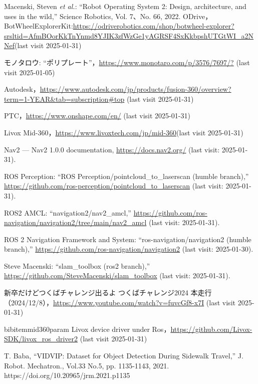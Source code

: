 \documentclass[twocolumn,9pt]{jsproceedings}
\begin{document}
\footnotesize
\begin{thebibliography}{99}
  Macenski, Steven {\it et al.}: ``Robot Operating System 2: Design, architecture, and uses in the wild,''
  Science Robotics, Vol. 7、No. 66, 2022.
  ODrive，BotWheelExplorerKit:\url{https://odriverobotics.com/shop/botwheel-explorer?srsltid=AfmBOorKkTnYnmd8YJIK3zfWzGe1yAGRSF4SxKkbpshUTGtWI_a2NNef}(last visit 2025-01-31)

  モノタロウ: ``ポリプレート''，\url{https://www.monotaro.com/p/3576/7697/?} (last visit 2025-01-05)

  
  Autodesk，\url{https://www.autodesk.com/jp/products/fusion-360/overview?term=1-YEAR&tab=subscription#top} (last visit 2025-01-31)
  
  PTC，\url{https://www.onshape.com/en/} (last visit 2025-01-31)
  
  Livox Mid-360，\url{https://www.livoxtech.com/jp/mid-360}(last visit 2025-01-31)
  
  Nav2 — Nav2 1.0.0 documentation, \url{https://docs.nav2.org/} (last visit: 2025-01-31).
  
  ROS Perception: ``ROS Perception/pointcloud\_to\_laserscan (humble branch),'' \url{https://github.com/ros-perception/pointcloud_to_laserscan} (last visit: 2025-01-31).
  
  ROS2 AMCL: ``navigation2/nav2\_amcl,'' \url{https://github.com/ros-navigation/navigation2/tree/main/nav2_amcl}  (last visit: 2025-01-31).
  
  ROS 2 Navigation Framework and System: ``ros-navigation/navigation2 (humble branch),'' \url{https://github.com/ros-navigation/navigation2} (last visit: 2025-01-30).
  
  Steve Macenski: ``slam\_toolbox (ros2 branch),'' \url{https://github.com/SteveMacenski/slam_toolbox} (last visit: 2025-01-31).

  新卒だけどつくばチャレンジ出るよ つくばチャレンジ2024 本走行（2024/12/8），\url{https://www.youtube.com/watch?v=fuvcGf8-x7I} (last visit 2025-01-31)
  
  bibitem{mid360param}
  Livox device driver under Ros，\url{https://github.com/Livox-SDK/livox_ros_driver2} (last visit 2025-01-31)

  T. Baba, “VIDVIP: Dataset for Object Detection During Sidewalk Travel,” J. Robot. Mechatron., Vol.33 No.5, pp. 1135-1143, 2021. https://doi.org/10.20965/jrm.2021.p1135
  
\end{thebibliography}
\normalsize

\clearpage
\end{document}
